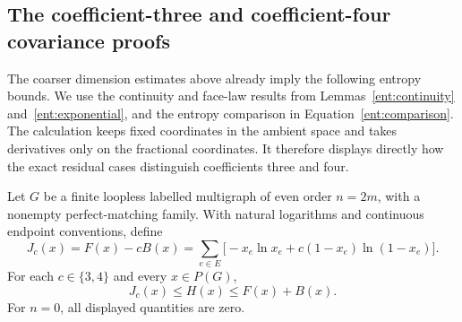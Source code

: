 \subsection{The coefficient-three and coefficient-four covariance proofs}

The coarser dimension estimates above already imply the following
entropy bounds. We use the continuity and face-law results from
Lemmas~\ref{ent:continuity} and~\ref{ent:exponential}, and the entropy
comparison in Equation~\eqref{ent:comparison}. The calculation keeps
fixed coordinates in the ambient space and takes derivatives only on
the fractional coordinates. It therefore displays directly how the
exact residual cases distinguish coefficients three and four.

\begin{samepage}
\begin{theorem}
\label{a:thm-separable}
Let \(G\) be a finite loopless labelled multigraph of even order
\(n=2m\), with a nonempty perfect-matching family. With natural
logarithms and continuous endpoint conventions, define
\[
 J_c(x)=F(x)-cB(x)
   =\sum_{e\in E}\bigl[-x_e\ln x_e+c(1-x_e)\ln(1-x_e)\bigr].
\]
For each \(c\in\{3,4\}\) and every \(x\in P(G)\),
\begin{equation}\label{a:eq-separable-bounds}
 J_c(x)\le H(x)\le F(x)+B(x).
\end{equation}
For \(n=0\), all displayed quantities are zero.
\end{theorem}
\end{samepage}

